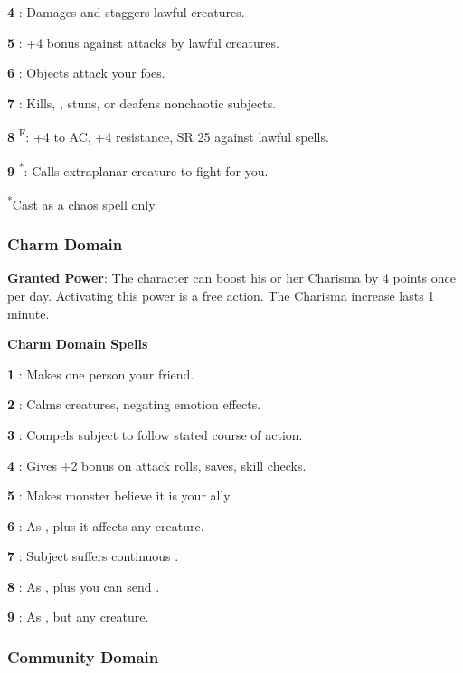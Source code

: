 \textbf{4} : Damages and staggers lawful creatures.

\textbf{5} : +4 bonus against attacks by lawful creatures.

\textbf{6} : Objects attack your foes.

\textbf{7} : Kills, , stuns, or deafens nonchaotic subjects.

\textbf{8} \textsuperscript{F}: +4 to AC, +4 resistance, SR 25 against lawful spells.

\textbf{9} \textsuperscript{*}: Calls extraplanar creature to fight for you.

\textsuperscript{*}Cast as a chaos spell only.

\subsubsection{Charm Domain}

\textbf{Granted Power}: The character can boost his or her Charisma by 4 points once per day. Activating this power is a free action. The Charisma increase lasts 1 minute.

\textbf{Charm Domain Spells}

\textbf{1} : Makes one person your friend.

\textbf{2} : Calms creatures, negating emotion effects.

\textbf{3} : Compels subject to follow stated course of action.

\textbf{4} : Gives +2 bonus on attack rolls, saves, skill checks.

\textbf{5} : Makes monster believe it is your ally.

\textbf{6} : As , plus it affects any creature.

\textbf{7} : Subject suffers continuous .

\textbf{8} : As , plus you can send .

\textbf{9} : As , but any creature.

\subsubsection{Community Domain}

